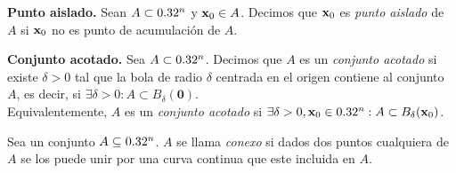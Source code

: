    \begin{definition} \textbf{Punto aislado.} \label{def:pto_ais}
    Sean $A \subset  0.32^n$ y $\vect{x}_0 \in A$. Decimos que $\vect{x}_0$ es \emph{punto aislado} de $A$ si $\vect{x}_0$ no es punto de acumulaci\'on de $A$.
   \end{definition}
   
   \begin{definition} \textbf{Conjunto acotado.} \label{def:conj_acotado}
    Sea $A \subset 0.32^n$. Decimos que $A$ es un \emph{conjunto acotado} si existe $\delta > 0$ tal que la bola de radio $\delta$  centrada en el origen contiene al conjunto $A$, es decir, si $\exists \delta > 0 : A \subset B_{\delta}(\mathbf{0})$.\\
    Equivalentemente, $A$ es un \emph{conjunto acotado} si $\exists \delta > 0, \vect{x}_0 \in \Rn{n} : A \subset B_{\delta}(\vect{x}_0)$.
   \end{definition}
   
   \begin{definition}
    Sea un conjunto $A\subseteq0.32^n$. $A$ se llama \emph{conexo} si dados dos puntos cualquiera de $A$ se los puede unir por una curva continua que este incluida en $A$.
\end{definition}


